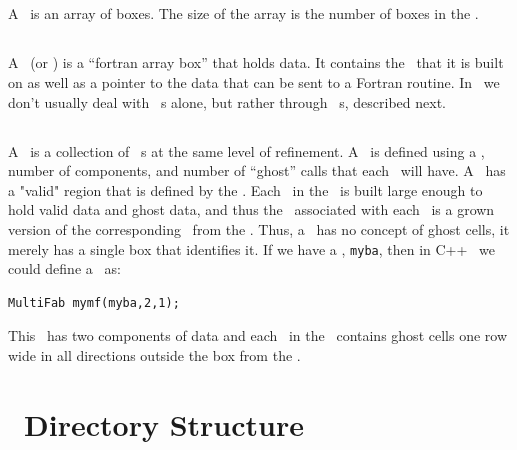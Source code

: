 \subsection{\BoxArray}

A \BoxArray\ is an array of boxes.   The size of the array is the 
number of boxes in the \BoxArray.

\subsection{\FArrayBox}

A \FArrayBox\ (or \Fab) is a ``fortran array box'' that holds data.  It contains the
\BoxType\ that it is built on as well as a pointer to the data 
that can be sent to a Fortran routine.  In \BoxLib\, we don't usually deal with 
\Fab~s alone, but rather
through \MultiFab~s, described next.

\subsection{\MultiFab}

A \MultiFab\ is a collection of \Fab~s at the same level of
refinement.  A \MultiFab\ is defined using a \BoxArray,
number of components, and number of ``ghost'' calls that each \Fab\
will have.  A \MultiFab\ has a "valid" region that is defined by 
the \BoxArray.  Each \Fab\ in the \MultiFab\ is built large enough 
to hold valid data and ghost data, and thus the \BoxType\ associated with
each \Fab\ is a grown version of the corresponding \BoxType\ from the \BoxArray.
Thus, a \Fab\ has no concept 
of ghost cells, it merely has a single box that identifies it.  
If we have a \BoxArray, {\tt myba}, then in C++ \BoxLib\ we could 
define a \MultiFab\ as:
\begin{verbatim}
MultiFab mymf(myba,2,1);
\end{verbatim}
This \MultiFab\ has two components of data and each \Fab\ in the \MultiFab\ contains 
ghost cells one row wide in all directions outside the box from the \BoxArray.



\section{\BoxLib\ Directory Structure}


